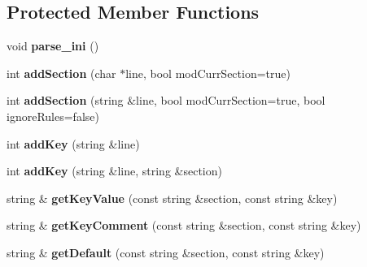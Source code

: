 \subsection*{\-Protected \-Member \-Functions}
\begin{DoxyCompactItemize}
\item 
\hypertarget{classINIReader_aec8a849e8af0a2cac8d17c346ca67f5b}{void {\bfseries parse\-\_\-ini} ()}\label{d5/de4/classINIReader_aec8a849e8af0a2cac8d17c346ca67f5b}

\item 
\hypertarget{classINIReader_a8b4eee32f6d7acdaff255a0bffed1da2}{int {\bfseries add\-Section} (char $\ast$line, bool mod\-Curr\-Section=true)}\label{d5/de4/classINIReader_a8b4eee32f6d7acdaff255a0bffed1da2}

\item 
\hypertarget{classINIReader_a96e5e897303456ca2daa6ef3b97fb1a3}{int {\bfseries add\-Section} (string \&line, bool mod\-Curr\-Section=true, bool ignore\-Rules=false)}\label{d5/de4/classINIReader_a96e5e897303456ca2daa6ef3b97fb1a3}

\item 
\hypertarget{classINIReader_a652b3278f888b4b6adc1fc47c05d7eed}{int {\bfseries add\-Key} (string \&line)}\label{d5/de4/classINIReader_a652b3278f888b4b6adc1fc47c05d7eed}

\item 
\hypertarget{classINIReader_a8c13740b6347288c69c627d1c8ead5b3}{int {\bfseries add\-Key} (string \&line, string \&section)}\label{d5/de4/classINIReader_a8c13740b6347288c69c627d1c8ead5b3}

\item 
\hypertarget{classINIReader_a585dfd12ccc146635cc7d911087a5446}{string \& {\bfseries get\-Key\-Value} (const string \&section, const string \&key)}\label{d5/de4/classINIReader_a585dfd12ccc146635cc7d911087a5446}

\item 
\hypertarget{classINIReader_a54fd0bb75ae7b16eec08907174d70092}{string \& {\bfseries get\-Key\-Comment} (const string \&section, const string \&key)}\label{d5/de4/classINIReader_a54fd0bb75ae7b16eec08907174d70092}

\item 
\hypertarget{classINIReader_a40f1282c103a076c0568c731ae629f0c}{string \& {\bfseries get\-Default} (const string \&section, const string \&key)}\label{d5/de4/classINIReader_a40f1282c103a076c0568c731ae629f0c}

\end{DoxyCompactItemize}

